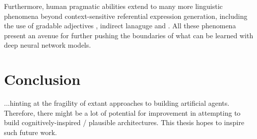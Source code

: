 Furthermore, human pragmatic abilities extend to many more linguistic phenomena beyond context-sensitive referential expression generation, including the use of gradable adjectives \parencite{qing2014gradable}, indirect lanaguge \parencite{yoon2016talking} and .
All these phenomena present an avenue for further pushing the boundaries of what can be learned with deep neural network models. 

\section{Conclusion}
...hinting at the fragility of extant approaches to building artificial agents. Therefore, there might be a lot of potential for improvement in attempting to build cognitively-inspired / plausible architectures. This thesis hopes to inspire such future work. 
